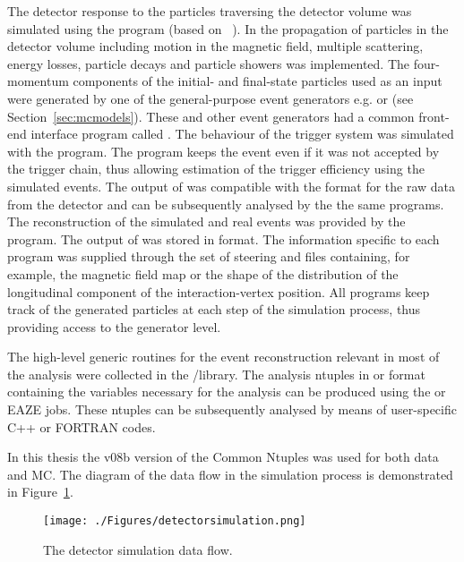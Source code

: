 The detector response to the particles traversing the detector volume was simulated using the \mozart program (based on ~\cite{tech:cern-dd-ee-84-1}). In \mozart the propagation of particles in the detector volume including motion in the magnetic field, multiple scattering, energy losses, particle decays and particle showers was implemented. The four-momentum components of the initial- and final-state particles used as an input were generated by one of the general-purpose event generators e.g. \lepto or \ariadne (see Section~\ref{sec:mcmodels}). These and other event generators had a common front-end interface program called \amadeus. The behaviour of the trigger system was simulated with the \zgana program. The \zgana program keeps the event even if it was not accepted by the trigger chain, thus allowing estimation of the trigger efficiency using the simulated events. The output of \zgana was compatible with the format for the raw data from the detector and can be subsequently analysed by the the same programs. The reconstruction of the simulated and real events was provided by the \zephyr program. The output of \zephyr was stored in \adamo format. The information specific to each program was supplied through the set of steering and \gaf files containing, for example, the magnetic field map or the shape of the distribution of the longitudinal component of the interaction-vertex position. All programs keep track of the generated particles at each step of the simulation process, thus providing access to the generator level.

The high-level generic routines for the event reconstruction relevant in most of the analysis were collected in the \orange/\phantom library. The analysis ntuples in \paw or \root format containing the variables necessary for the analysis can be produced using the \orange or EAZE jobs. These ntuples can be subsequently analysed by means of user-specific C++ or FORTRAN codes. 

In this thesis the v08b version of the Common Ntuples was used for both data and MC. The diagram of the data flow in the simulation process is demonstrated in Figure~\ref{fig:detectorsimulation}.

\begin{figure}[p]
	\centering
		\texttt{[image: ./Figures/detectorsimulation.png]}
	\caption{The \zeus detector simulation data flow.}
	\label{fig:detectorsimulation}
\end{figure}
